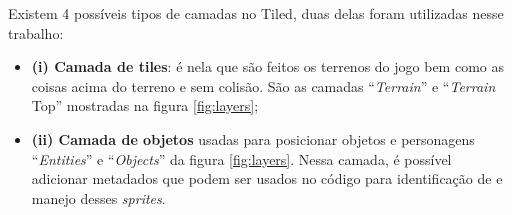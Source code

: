 Existem 4 possíveis tipos de camadas no Tiled, duas delas foram utilizadas nesse trabalho: 
\begin{itemize}
    \item \textbf{(i) Camada de tiles}: é nela que são feitos os terrenos do jogo bem como as coisas acima do terreno e sem colisão. São as camadas ``\textit{Terrain}'' e ``\textit{Terrain} Top'' mostradas na figura \ref{fig:layers};
    \item \textbf{(ii) Camada de objetos} usadas para posicionar objetos e personagens ``\textit{Entities}'' e ``\textit{Objects}'' da figura \ref{fig:layers}. Nessa camada, é possível adicionar metadados que podem ser usados no código para identificação de e manejo desses \textit{sprites}.
\end{itemize}



